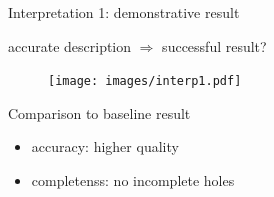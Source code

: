 \documentclass[10pt]{beamer}
\begin{document}

\begin{frame}{Interpretation 1: demonstrative result}

accurate description $\Rightarrow$ successful result?

\begin{figure}
\centering
\texttt{[image: images/interp1.pdf]}
\end{figure}

\begin{exampleblock}{Comparison to baseline result}
\begin{itemize}
\item accuracy: higher quality
\item completenss: no incomplete holes
\end{itemize}
\end{exampleblock}

\end{frame}
\end{document}
